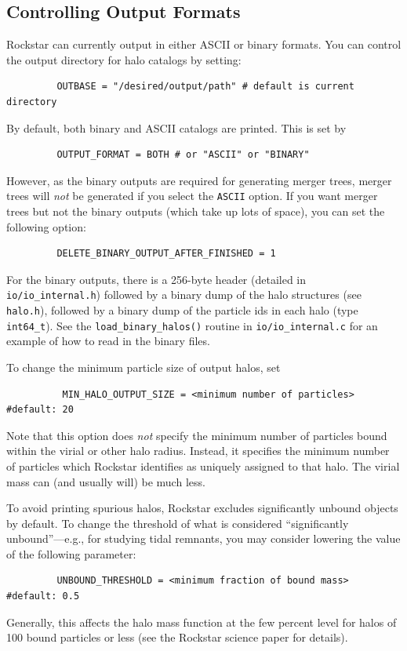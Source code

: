 \documentclass[12pt]{article}
\begin{document}
\subsection{Controlling Output Formats}
\label{s:output_formats}
      Rockstar can currently output in either ASCII or binary formats.
      You can control the output directory for halo catalogs by setting:
\begin{verbatim}
         OUTBASE = "/desired/output/path" # default is current directory
\end{verbatim}
      By default, both binary and ASCII catalogs are printed.  This is set by
\begin{verbatim}
         OUTPUT_FORMAT = BOTH # or "ASCII" or "BINARY"
\end{verbatim}
      However, as the binary outputs are required for generating merger trees,
      merger trees will \textit{not} be generated if you select the \texttt{ASCII} option.
      If you want merger trees but not the binary outputs (which take up
      lots of space), you can set the following option:
\begin{verbatim}
         DELETE_BINARY_OUTPUT_AFTER_FINISHED = 1
\end{verbatim}
      For the binary outputs, there is a 256-byte header (detailed in
      \texttt{io/io\_internal.h}) followed by a binary dump of the halo structures
      (see \texttt{halo.h}), followed by a binary dump of the particle ids in
      each halo (type \texttt{int64\_t}).  See the \texttt{load\_binary\_halos()} routine in
      \texttt{io/io\_internal.c} for an example of how to read in the binary files.

      To change the minimum particle size of output halos, set
\begin{verbatim}
          MIN_HALO_OUTPUT_SIZE = <minimum number of particles> #default: 20
\end{verbatim}
      Note that this option does \textit{not} specify the minimum number of particles
      bound within the virial or other halo radius.  Instead, it specifies the
      minimum number of particles which Rockstar identifies as uniquely assigned
      to that halo.  The virial mass can (and usually will) be much less.

      To avoid printing spurious halos, Rockstar excludes significantly 
      unbound objects by default.  To change the threshold of what is considered
      ``significantly unbound''---e.g., for studying tidal remnants, you may
      consider lowering the value of the following parameter:      
\begin{verbatim}
      	 UNBOUND_THRESHOLD = <minimum fraction of bound mass> #default: 0.5
\end{verbatim}
      Generally, this affects the halo mass function at the few percent level
      for halos of 100 bound particles or less (see the Rockstar science paper for details).
\end{document}
